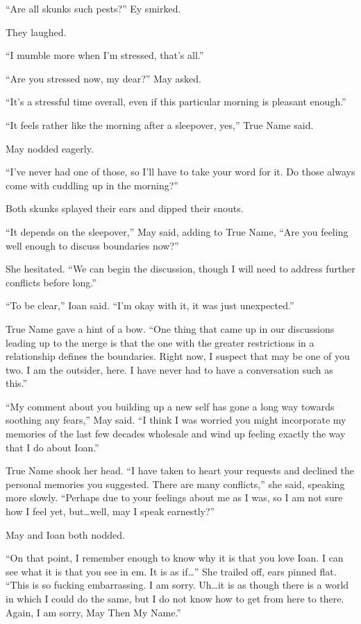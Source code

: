 ``Are all skunks such pests?'' Ey smirked.

They laughed.

``I mumble more when I'm stressed, that's all.''

``Are you stressed now, my dear?'' May asked.

``It's a stressful time overall, even if this particular morning is pleasant enough.''

``It feels rather like the morning after a sleepover, yes,'' True Name said.

May nodded eagerly.

``I've never had one of those, so I'll have to take your word for it. Do those always come with cuddling up in the morning?''

Both skunks splayed their ears and dipped their snouts.

``It depends on the sleepover,'' May said, adding to True Name, ``Are you feeling well enough to discuss boundaries now?''

She hesitated. ``We can begin the discussion, though I will need to address further conflicts before long.''

``To be clear,'' Ioan said. ``I'm okay with it, it was just unexpected.''

True Name gave a hint of a bow. ``One thing that came up in our discussions leading up to the merge is that the one with the greater restrictions in a relationship defines the boundaries. Right now, I suspect that may be one of you two. I am the outsider, here. I have never had to have a conversation such as this.''

``My comment about you building up a new self has gone a long way towards soothing any fears,'' May said. ``I think I was worried you might incorporate my memories of the last few decades wholesale and wind up feeling exactly the way that I do about Ioan.''

True Name shook her head. ``I have taken to heart your requests and declined the personal memories you suggested. There are many conflicts,'' she said, speaking more slowly. ``Perhaps due to your feelings about me as I was, so I am not sure how I feel yet, but\ldots well, may I speak earnestly?''

May and Ioan both nodded.

``On that point, I remember enough to know why it is that you love Ioan. I can see what it is that you see in em. It is as if\ldots{}'' She trailed off, ears pinned flat. ``This is so fucking embarrassing. I am sorry. Uh\ldots it is as though there is a world in which I could do the same, but I do not know how to get from here to there. Again, I am sorry, May Then My Name.''

